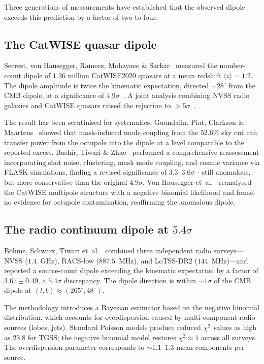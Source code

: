 Three generations of measurements have established that
the observed dipole exceeds this prediction by a factor
of two to four.


\subsection{The CatWISE quasar dipole}
\label{sec:catwise}

Secrest, von Hausegger, Rameez, Mohayaee \&
Sarkar~\cite{Secrest2021} measured the number-count dipole
of $1.36$ million CatWISE2020 quasars at a mean redshift
$\langle z \rangle = 1.2$.  The dipole amplitude is twice
the kinematic expectation, directed $\sim\!28^\circ$ from
the CMB dipole, at a significance of
$4.9\sigma$~\cite{Secrest2021}.  A joint analysis combining
NVSS radio galaxies and CatWISE quasars raised the
rejection to $> 5\sigma$~\cite{Secrest2022}.

The result has been scrutinised for systematics.
Guandalin, Piat, Clarkson \&
Maartens~\cite{Guandalin2023} showed that mask-induced
mode coupling from the $52.6\%$ sky cut can transfer power
from the octupole into the dipole at a level comparable to
the reported excess.  Bashir, Tiwari \&
Zhao~\cite{Bashir2025} performed a comprehensive
reassessment incorporating shot noise, clustering, mask
mode coupling, and cosmic variance via FLASK simulations,
finding a revised significance of
$3.3$--$3.6\sigma$---still anomalous, but more conservative
than the original $4.9\sigma$.  Von Hausegger
et~al.~\cite{vonHausegger2026} reanalysed the CatWISE
multipole structure with a negative binomial likelihood and
found no evidence for octupole contamination, reaffirming the
anomalous dipole.


\subsection{The radio continuum dipole at $5.4\sigma$}
\label{sec:radio-dipole}

B{\"o}hme, Schwarz, Tiwari
et~al.~\cite{Boehme2025} combined three independent radio
surveys---NVSS ($1.4$~GHz), RACS-low ($887.5$~MHz), and
LoTSS-DR2 ($144$~MHz)---and reported a source-count dipole
exceeding the kinematic expectation by a factor of
$3.67 \pm 0.49$, a $5.4\sigma$ discrepancy.  The dipole
direction is within $\sim\!1\sigma$ of the CMB dipole at
$(l, b) \approx (265^\circ, 48^\circ)$.

The methodology introduces a Bayesian estimator based on
the negative binomial distribution, which accounts for
overdispersion caused by multi-component radio sources
(lobes, jets).  Standard Poisson models produce reduced
$\chi^2$ values as high as $23.8$ for TGSS; the negative
binomial model restores $\chi^2 \approx 1$ across all
surveys.  The overdispersion parameter corresponds to
$\sim\!1.1$--$1.3$ mean components per source.

